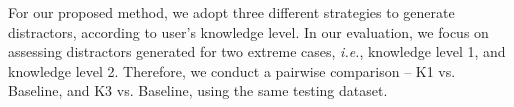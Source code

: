 For our proposed method, we adopt three different strategies to generate distractors, according to user's knowledge level. In our evaluation, we focus on assessing distractors generated for two extreme cases, {\it i.e.}, knowledge level 1, and knowledge level 2. Therefore, we conduct a pairwise comparison -- K1  vs. Baseline, and K3  vs. Baseline, using the same testing dataset.



%





